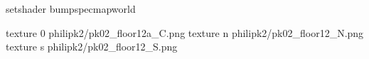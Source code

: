 setshader bumpspecmapworld

texture 0 philipk2/pk02_floor12a_C.png
texture n philipk2/pk02_floor12_N.png
texture s philipk2/pk02_floor12_S.png

